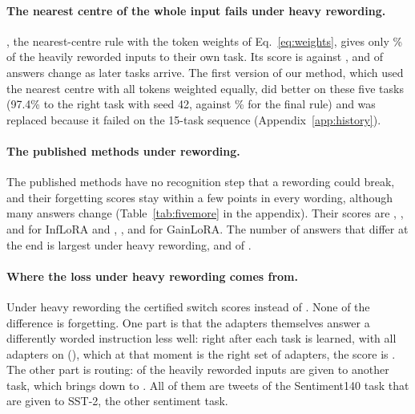 \paragraph{The nearest centre of the whole input fails under heavy rewording.} \centre{}, the nearest-centre rule with the token weights of Eq.~\eqref{eq:weights}, gives only
\FiveCentreRightHeavy{}\% of the heavily reworded inputs to their own task. Its score is
\FiveCentreAPHeavy{} against \FiveCertAPHeavy{}, and \FiveCentreChangedHeavy{} of
\FiveCentreComparedHeavy{} answers change as later tasks arrive. The first version of our method, which used the nearest centre
with all tokens weighted equally, did better on these five tasks (97.4\% to the right task with seed 42, against
\FiveCertRightHeavy{}\% for the final rule) and was replaced because it failed on the 15-task sequence (Appendix~\ref{app:history}).

\paragraph{The published methods under rewording.} The published methods have no recognition step that a rewording could break, and
their forgetting scores stay within a few points in every wording, although many answers change (Table~\ref{tab:fivemore} in the
appendix). Their scores are \FiveInfAP{}, \FiveInfAPLight{}, \FiveInfAPMedium{} and
\FiveInfAPHeavy{} for InfLoRA and \FiveGainAP{}, \FiveGainAPLight{}, \FiveGainAPMedium{} and
\FiveGainAPHeavy{} for GainLoRA. The number of answers that differ at the end is largest under
heavy rewording, \FiveInfChangedHeavy{} and \FiveGainChangedHeavy{} of \FiveInfComparedHeavy{}.

\paragraph{Where the loss under heavy rewording comes from.} Under heavy rewording the certified switch scores \FiveCertAPHeavy{} instead of
\FiveCertAP{}. None of the difference is forgetting. One part is that the adapters themselves answer
a differently worded instruction less well: right after each task is learned, with all adapters on
(\plain{}), which at that moment is the right set of adapters, the score is
\FivePlainLearnedHeavy{}. The other part is routing:
\FiveCertWrongHeavy{} of the \FiveCertInputsOne{} heavily reworded inputs are given to another task,
which brings \FivePlainLearnedHeavy{} down to \FiveCertLearnedHeavy{}. All of them are tweets of the
Sentiment140 task that are given to SST-2, the other sentiment task.

